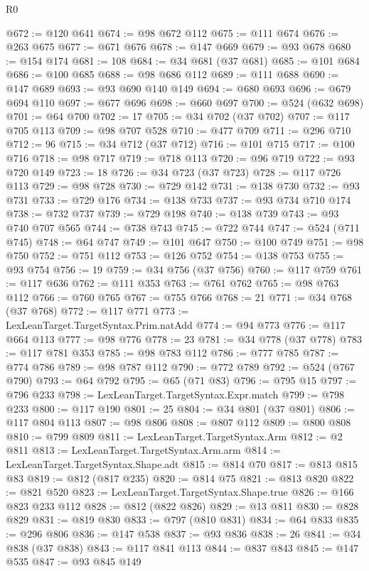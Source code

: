 \begin{lexlean}{R0}
\begin{coremodule}
@672 := @120 @641
@674 := @98 @672 @112
@675 := @111 @674
@676 := @263 @675
@677 := @671 @676
@678 := @147 @669
@679 := @93 @678
@680 := @154 @174
@681 := 108
@684 := @34 @681 (@37 @681)
@685 := @101 @684
@686 := @100 @685
@688 := @98 @686 @112
@689 := @111 @688
@690 := @147 @689
@693 := @93 @690 @140 @149
@694 := @680 @693
@696 := @679 @694 @110
@697 := @677 @696
@698 := @660 @697
@700 := @524 (@632 @698)
@701 := @64 @700
@702 := 17
@705 := @34 @702 (@37 @702)
@707 := @117 @705 @113
@709 := @98 @707 @528
@710 := @477 @709
@711 := @296 @710
@712 := 96
@715 := @34 @712 (@37 @712)
@716 := @101 @715
@717 := @100 @716
@718 := @98 @717
@719 := @718 @113
@720 := @96 @719
@722 := @93 @720 @149
@723 := 18
@726 := @34 @723 (@37 @723)
@728 := @117 @726 @113
@729 := @98 @728
@730 := @729 @142
@731 := @138 @730
@732 := @93 @731
@733 := @729 @176
@734 := @138 @733
@737 := @93 @734 @710 @174
@738 := @732 @737
@739 := @729 @198
@740 := @138 @739
@743 := @93 @740 @707 @565
@744 := @738 @743
@745 := @722 @744
@747 := @524 (@711 @745)
@748 := @64 @747
@749 := @101 @647
@750 := @100 @749
@751 := @98 @750
@752 := @751 @112
@753 := @126 @752
@754 := @138 @753
@755 := @93 @754
@756 := 19
@759 := @34 @756 (@37 @756)
@760 := @117 @759
@761 := @117 @636
@762 := @111 @353
@763 := @761 @762
@765 := @98 @763 @112
@766 := @760 @765
@767 := @755 @766
@768 := 21
@771 := @34 @768 (@37 @768)
@772 := @117 @771
@773 := LexLeanTarget.TargetSyntax.Prim.natAdd
@774 := @94 @773
@776 := @117 @664 @113
@777 := @98 @776
@778 := 23
@781 := @34 @778 (@37 @778)
@783 := @117 @781 @353
@785 := @98 @783 @112
@786 := @777 @785
@787 := @774 @786
@789 := @98 @787 @112
@790 := @772 @789
@792 := @524 (@767 @790)
@793 := @64 @792
@795 := @65 (@71 @83)
@796 := @795 @15
@797 := @796 @233
@798 := LexLeanTarget.TargetSyntax.Expr.match
@799 := @798 @233
@800 := @117 @190
@801 := 25
@804 := @34 @801 (@37 @801)
@806 := @117 @804 @113
@807 := @98 @806
@808 := @807 @112
@809 := @800 @808
@810 := @799 @809
@811 := LexLeanTarget.TargetSyntax.Arm
@812 := @2 @811
@813 := LexLeanTarget.TargetSyntax.Arm.arm
@814 := LexLeanTarget.TargetSyntax.Shape.adt
@815 := @814 @70
@817 := @813 @815 @83
@819 := @812 (@817 @235)
@820 := @814 @75
@821 := @813 @820
@822 := @821 @520
@823 := LexLeanTarget.TargetSyntax.Shape.true
@826 := @166 @823 @233 @112
@828 := @812 (@822 @826)
@829 := @13 @811
@830 := @828 @829
@831 := @819 @830
@833 := @797 (@810 @831)
@834 := @64 @833
@835 := @296 @806
@836 := @147 @538
@837 := @93 @836
@838 := 26
@841 := @34 @838 (@37 @838)
@843 := @117 @841 @113
@844 := @837 @843
@845 := @147 @535
@847 := @93 @845 @149

\end{coremodule}
\end{lexlean}
